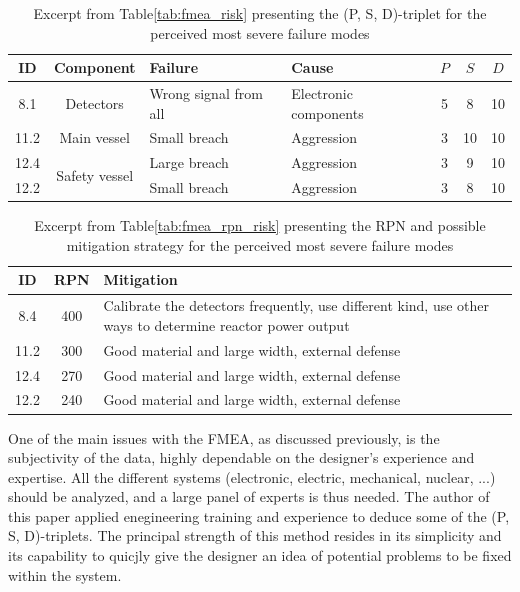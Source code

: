 \begin{table}[!htb]
    \centering
        \begin{tabular}{ccp{4cm}p{4cm}ccc}
            \hline
            ID & Component & Failure & Cause & $P$ & $S$ & $D$ \\ \hline \hline
            8.1 & \multirow{1}{3cm}{Detectors}  & Wrong signal from all & Electronic components & 5 & 8 & 10 \\ \hline
            11.2 & \multirow{1}{3cm}{Main vessel} & Small breach & Aggression & 3 & 10 & 10 \\ \hline
            12.4 & \multirow{2}{3cm}{Safety vessel}  & Large breach & Aggression & 3 & 9 & 10 \\ 
            12.2 &                                   & Small breach & Aggression & 3 & 8 & 10 \\
        \end{tabular}
        \caption{Excerpt from Table\ref{tab:fmea_risk} presenting the (P, S, D)-triplet for the perceived most severe failure modes}\label{tab:excerpt_fmea}
\end{table}


\begin{table}[!htb]
    \centering
        \begin{tabular}{ccp{10cm}}
            \hline
            ID & RPN & Mitigation \\ \hline\hline
            8.4 & 400  & Calibrate the detectors frequently, use different kind, use other ways to determine reactor power output \\
            11.2 & 300 & Good material and large width, external defense \\
            12.4 & 270 & Good material and large width, external defense \\
            12.2 & 240 & Good material and large width, external defense \\
        \end{tabular}
        \caption{Excerpt from Table\ref{tab:fmea_rpn_risk} presenting the RPN and possible mitigation strategy for the perceived most severe failure modes}\label{tab:excerpt_rpn_fmea}
\end{table}

One of the main issues with the FMEA, as discussed previously, is the subjectivity of the data, highly dependable on the designer's experience and expertise. All the different systems (electronic, electric, mechanical, nuclear, ...) should be analyzed, and a large panel of experts is thus needed. The author of this paper applied enegineering training and experience to deduce some of the (P, S, D)-triplets. The principal strength of this method resides in its simplicity and its capability to quicjly give the designer an idea of potential problems to be fixed within the system.

